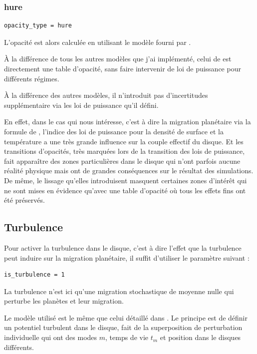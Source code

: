 \subsubsection{hure}
\begin{verbatim}
opacity_type = hure
\end{verbatim}

L'opacité est alors calculée en utilisant le modèle fourni par \cite{hure2000transition}. 

À la différence de tous les autres modèles que j'ai implémenté, celui de \cite{hure2000transition} est directement une table d'opacité, sans faire intervenir de loi de puissance pour différents régimes. 

À la différence des autres modèles, il n'introduit pas d'incertitudes supplémentaire via les loi de puissance qu'il défini. 

En effet, dans le cas qui nous intéresse, c'est à dire la migration planétaire via la formule de \citep{paardekooper2011torque}, l'indice des loi de puissance pour la densité de surface et la température a une très grande influence sur la couple effectif du disque. Et les transitions d'opacités, très marquées lors de la transition des lois de puissance, fait apparaître des zones particulières dans le disque qui n'ont parfois aucune réalité physique mais ont de grandes conséquences sur le résultat des simulations. De même, le lissage qu'elles introduisent masquent certaines zones d'intérêt qui ne sont mises en évidence qu'avec une table d'opacité où tous les effets fins ont été préservés.

\subsection{Turbulence}
Pour activer la turbulence dans le disque, c'est à dire l'effet que la turbulence peut induire sur la migration planétaire, il suffit d'utiliser le paramètre suivant : 
\begin{verbatim}
is_turbulence = 1
\end{verbatim}

La turbulence n'est ici qu'une migration stochastique de moyenne nulle qui perturbe les planètes et leur migration. 

Le modèle utilisé est le même que celui détaillé dans \cite{ogihara2007accretion}. Le principe est de définir un potentiel turbulent dans le disque, fait de la superposition de perturbation individuelle qui ont des modes $m$, temps de vie $t_m$ et position dans le disques différents. 

